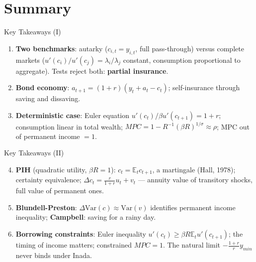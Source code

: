 \documentclass[blue]{beamer}
\newcommand{\E}{\mathbb{E}}
\begin{document}
	\section{Summary}
	
	\begin{frame}{Key Takeaways (I)}
		\begin{enumerate}
			\item \textbf{Two benchmarks}: autarky ($c_{i,t} = y_{i,t}$, full pass-through) versus complete markets ($u'(c_i)/u'(c_j) = \lambda_i/\lambda_j$ constant, consumption proportional to aggregate). Tests reject both: \textbf{partial insurance}.
			
			\item \textbf{Bond economy}: $a_{t+1} = (1+r)(y_t + a_t - c_t)$; self-insurance through saving and dissaving.
			
			\item \textbf{Deterministic case}: Euler equation $u'(c_t)/\beta u'(c_{t+1}) = 1+r$; consumption linear in total wealth; $MPC = 1 - R^{-1}(\beta R)^{1/\sigma} \approx \rho$; MPC out of permanent income $= 1$.
		\end{enumerate}
	\end{frame}
	
	\begin{frame}{Key Takeaways (II)}
		\begin{enumerate}
			\setcounter{enumi}{3}
			\item \textbf{PIH} (quadratic utility, $\beta R = 1$): $c_t = \E_t c_{t+1}$, a martingale (Hall, 1978); certainty equivalence; $\Delta c_t = \frac{r}{1+r}u_t + v_t$ --- annuity value of transitory shocks, full value of permanent ones.
			
			\item \textbf{Blundell-Preston}: $\Delta\text{Var}(c) \approx \text{Var}(v)$ identifies permanent income inequality; \textbf{Campbell}: saving for a rainy day.
			
			\item \textbf{Borrowing constraints}: Euler inequality $u'(c_t) \geq \beta R\E_t u'(c_{t+1})$; the timing of income matters; constrained $MPC = 1$. The natural limit $-\frac{1+r}{r}y_{min}$ never binds under Inada.
		\end{enumerate}
	\end{frame}
	
\end{document}
